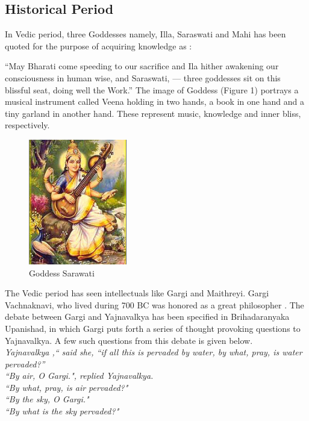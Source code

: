 \documentclass[a4paper,10pt]{article}
\begin{document}
\subsection{Historical Period}
In Vedic period, three Goddesses namely, Illa, Saraswati and Mahi has been quoted for the purpose of acquiring knowledge as \cite{saras}: 

“May Bharati come speeding to our sacrifice and Ila hither awakening our consciousness in human wise, and Saraswati, — three goddesses sit on this blissful seat, doing well the
Work.” 
The image of Goddess (Figure 1) portrays a musical instrument called Veena holding in  two hands, a book in one hand and a tiny garland in another hand. These represent music, knowledge and inner bliss, respectively. 
\begin{center}
\begin{figure}[h]
\centering
 \includegraphics[scale=0.7]{saraswati.png}
 \caption{Goddess Sarawati}
\end{figure}
\end{center}

The Vedic period has seen intellectuals like Gargi and Maithreyi. Gargi Vachnaknavi, who lived during 700 BC was honored as a great philosopher \cite{Gargi}. The debate between Gargi and Yajnavalkya has been specified in Brihadaranyaka Upanishad, in which Gargi puts forth a series of thought provoking questions to Yajnavalkya. A few such questions from this debate is given below. \\




\textit{Yajnavalkya ,`` said she, ``if all this is pervaded by water, by  what, pray, is water pervaded?''} \\
\textit{``By air, O Gargi.", replied Yajnavalkya.} \\
\textit{``By what, pray, is air pervaded?" }\\
\textit{``By the sky, O Gargi."} \\
\textit{``By what is the sky pervaded?"}  \\
\end{document}
